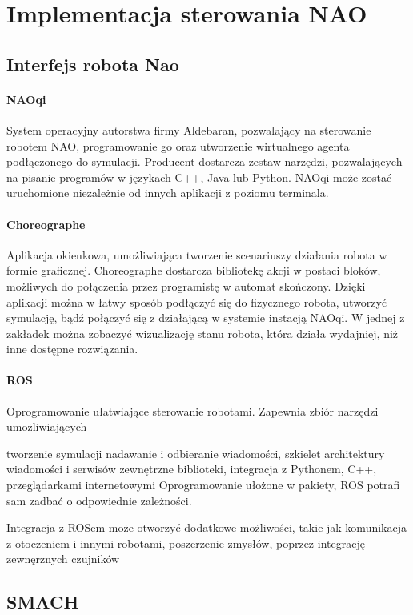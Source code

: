 \chapter{Implementacja sterowania NAO}
\section{Interfejs robota Nao}

\subsubsection{NAOqi} System operacyjny autorstwa firmy Aldebaran, pozwalający na sterowanie robotem NAO, programowanie go oraz utworzenie wirtualnego agenta podłączonego do symulacji. Producent dostarcza zestaw narzędzi, pozwalających na pisanie programów w językach C++, Java lub Python. NAOqi może zostać uruchomione niezależnie od innych aplikacji z poziomu terminala.

\subsubsection{Choreographe} Aplikacja okienkowa, umożliwiająca tworzenie scenariuszy działania robota w formie graficznej. Choreographe dostarcza bibliotekę akcji w postaci bloków, możliwych do połączenia przez programistę w automat skończony. Dzięki aplikacji można w łatwy sposób podłączyć się do fizycznego robota, utworzyć symulację, bądź połączyć się z działającą w systemie instacją NAOqi. W jednej z zakładek można zobaczyć wizualizację stanu robota, która działa wydajniej, niż inne dostępne rozwiązania.

\subsubsection{ROS} Oprogramowanie ułatwiające sterowanie robotami. Zapewnia zbiór narzędzi umożliwiających 

tworzenie symulacji
nadawanie i odbieranie wiadomości, szkielet architektury wiadomości i serwisów
zewnętrzne biblioteki, integracja z Pythonem, C++, przeglądarkami internetowymi
Oprogramowanie ułożone w pakiety, ROS potrafi sam zadbać o odpowiednie zależności.

Integracja z ROSem może otworzyć dodatkowe możliwości, takie jak komunikacja z otoczeniem i innymi robotami, poszerzenie zmysłów, poprzez integrację zewnęrznych czujników 



\section{SMACH}

